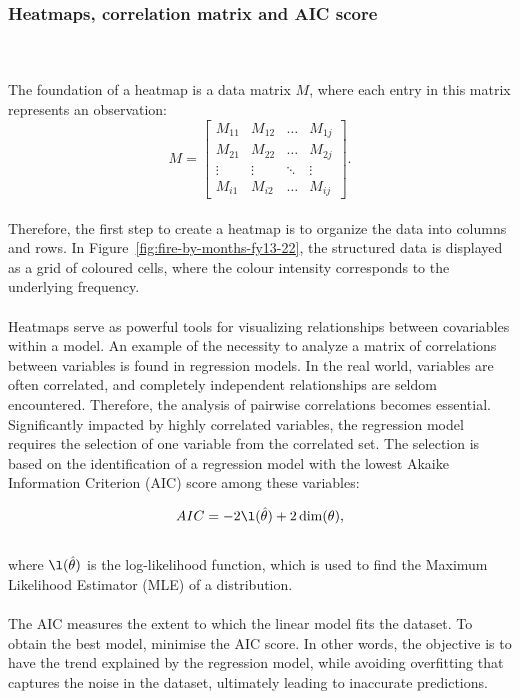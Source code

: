 \documentclass{article}\usepackage[]{graphicx}\usepackage[]{xcolor}
\begin{document}
\subsubsection{Heatmaps, correlation matrix and AIC score}
\\  
\\The foundation of a heatmap is a data matrix $M$, where each entry in this matrix represents an observation:
$$M =
\left[
\begin{array}{cccc}
    M_{11} & M_{12} & \ldots & M_{1j} \\  
    M_{21} & M_{22} & \ldots & M_{2j} \\  
    \vdots & \vdots & \ddots & \vdots \\  
    M_{i1} & M_{i2} & \ldots & M_{ij}
\end{array}
\right].
$$
\\Therefore, the first step to create a heatmap is to organize the data into columns and rows. In Figure~\ref{fig:fire-by-months-fy13-22}, the structured data is displayed as a grid of coloured cells, where the colour intensity corresponds to the underlying frequency.
\\  
\\Heatmaps serve as powerful tools for visualizing relationships between covariables within a model. An example of the necessity to analyze a matrix of correlations between variables is found in regression models. In the real world, variables are often correlated, and completely independent relationships are seldom encountered. Therefore, the analysis of pairwise correlations becomes essential. Significantly impacted by highly correlated variables, the regression model requires the selection of one variable from the correlated set. The selection is based on the identification of a regression model with the lowest Akaike Information Criterion (AIC) score among these variables: 

$$AIC = -2 \l(\hat{\mathbf{\theta}})+2 \dim (\mathbf{\theta}),$$
\\where $\l(\hat{\mathbf{\theta}})$ is the log-likelihood function, which is used to find the Maximum Likelihood Estimator (MLE) of a distribution.
\\  
\\The AIC measures the extent to which the linear model fits the dataset. To obtain the best model, minimise the AIC score. In other words, the objective is to have the trend explained by the regression model, while avoiding overfitting that captures the noise in the dataset, ultimately leading to inaccurate predictions.
\end{document}
